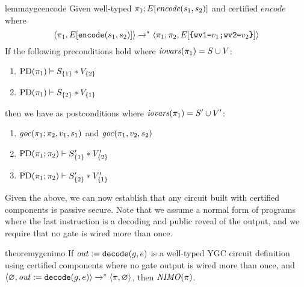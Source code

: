 \begin{restatable}{lemma}{ygcencode}
  \label{lemma-ygc-encode}
Given well-typed $\pi_1;E[\mathit{encode}(s_1,s_2)]$ and certified $\mathit{encode}$ where 
$$
\langle \pi_1,E[\texttt{encode}(s_1,s_2)] \rangle \xrightarrow{}^{*} \langle \pi_1;\pi_2,E[\texttt{\{wv1=}v_1\texttt{;wv2=}v_2\texttt{\}}] \rangle
$$
If the following preconditions hold where $\mathit{iovars}(\pi_1) = S \cup V$:
\begin{enumerate}
\item $\mathrm{PD}(\pi_1) \vdash S_{\{1\}} * V_{\{2\}}$
\item $\mathrm{PD}(\pi_1) \vdash S_{\{2\}} * V_{\{1\}}$
\end{enumerate}
then we have as postconditions where $\mathit{iovars}(\pi_1) = S' \cup V'$:
\begin{enumerate}
\item $\mathit{goc}(\pi_1;\pi_2,v_1,s_1)$ and $\mathit{goc}(\pi_1,v_2,s_2)$
\item $\mathrm{PD}(\pi_1;\pi_2) \vdash S'_{\{1\}} * V'_{\{2\}}$
\item $\mathrm{PD}(\pi_1;\pi_2) \vdash S'_{\{2\}} * V'_{\{1\}}$
\end{enumerate}
\end{restatable}

Given the above, we can now establish that any circuit built with
certified components is passive secure.  Note that we assume a normal
form of programs where the last instruction is a decoding and public
reveal of the output, and we require that no gate is wired more than once.
\begin{restatable}{theorem}{ygcnimo}
  \label{theorem-ygc-NIMO}
  If $\mathit{out} := \texttt{decode}(g,e)$ is a well-typed YGC circuit
  definition using certified components where no gate output is wired
  more than once, and
  $\langle \varnothing,\mathit{out} := \texttt{decode}(g,e) \rangle \xrightarrow{}^{*}
  \langle \pi,\varnothing \rangle$, then $\mathit{NIMO}(\pi)$.
\end{restatable}


